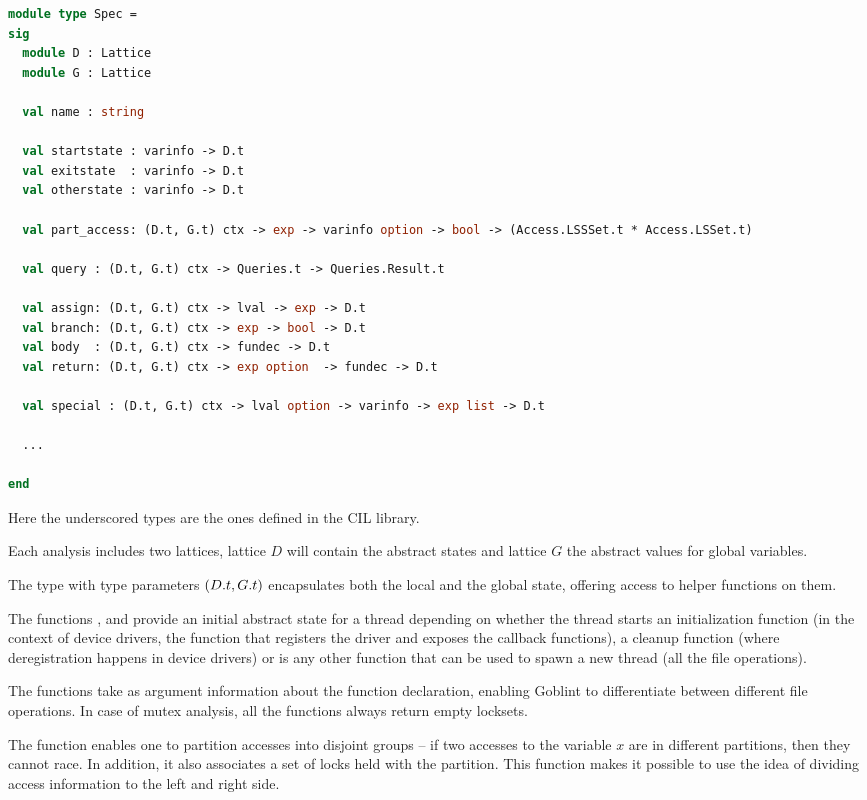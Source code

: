 \documentclass[..thesis.tex]{subfiles}
\begin{document}
\begin{lstlisting}[language=Caml,style=caml]
module type Spec =
sig
  module D : Lattice
  module G : Lattice

  val name : string

  val startstate : varinfo -> D.t
  val exitstate  : varinfo -> D.t
  val otherstate : varinfo -> D.t

  val part_access: (D.t, G.t) ctx -> exp -> varinfo option -> bool -> (Access.LSSSet.t * Access.LSSet.t)

  val query : (D.t, G.t) ctx -> Queries.t -> Queries.Result.t

  val assign: (D.t, G.t) ctx -> lval -> exp -> D.t
  val branch: (D.t, G.t) ctx -> exp -> bool -> D.t
  val body  : (D.t, G.t) ctx -> fundec -> D.t
  val return: (D.t, G.t) ctx -> exp option  -> fundec -> D.t

  val special : (D.t, G.t) ctx -> lval option -> varinfo -> exp list -> D.t

  ...

end
\end{lstlisting}

Here the underscored types are the ones defined in the CIL library.

Each analysis includes two lattices, lattice $D$ will contain the abstract states and lattice $G$ the abstract values for global variables.

The type  with type parameters $\left( D.t, G.t \right)$ encapsulates both the local and the global state, offering access to helper functions on them. 

The functions , and  provide an initial abstract state for a thread depending on whether the thread starts an
initialization function (in the context of device drivers, the function that registers the driver and exposes the callback functions),
a cleanup function (where deregistration happens in device drivers) or is any other function that can be used to spawn a new thread (all the file operations).

The functions take as argument information about the function declaration, enabling Goblint to differentiate between different file operations.
In case of mutex analysis, all the functions always return empty locksets.

The  function enables one to partition accesses into disjoint groups -- if two accesses to the variable $x$ are in different partitions, then they cannot race. In addition, it also associates a set of locks held with the partition. This function makes it possible to use the idea of dividing access information to the left and right side.
\end{document}
